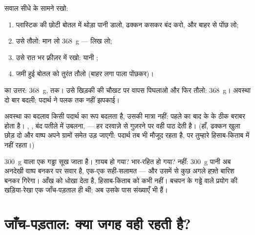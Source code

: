 \begin{method}\label{met:g6:water-states:weigh}
सवाल सीधे  के सामने रखो:
\begin{enumerate}
  \item प्लास्टिक की छोटी बोतल में थोड़ा पानी डालो, ढक्कन कसकर बंद
        करो, और बाहर से पोंछ लो;
  \item उसे तौलो: मान लो \qty{368}{g} --- लिख लो;
  \item उसे रात भर फ़्रीज़र में रखो: यानी ;
  \item जमी हुई बोतल को तुरंत तौलो (बाहर लगा पाला पोंछकर)।
\end{enumerate}
 का उत्तर: \qty{368}{g},  तक। उसे खिड़की की चौखट पर वापस
पिघलाओ और फिर तौलो: \qty{368}{g}। अवस्था दो बार बदली; पदार्थ ने पलक
तक नहीं झपकाई।
\end{method}

\begin{proposition}\label{prop:g6:water-states:mass}
अवस्था का बदलाव किसी पदार्थ का रूप बदलता है, उसकी मात्रा नहीं: पहले
का  बाद के  के ठीक बराबर होता है। , , बंद
पतीले में उबलना,  --- हर दरवाज़े से गुज़रने पर  वही पाठ देती
है। (हाँ, ढक्कन खुला छोड़ दो और वाष्प अपने ग्रामों समेत उड़ जाएगी:
पदार्थ तब भी मौजूद रहता है, पर तुम्हारे हिसाब-किताब में नहीं रहता।)
\end{proposition}

\begin{example}[गड्ढे के ग्राम गए कहाँ]\label{ex:g6:water-states:puddle}
\qty{300}{g} वाला एक गड्ढा सूख जाता है। ग़ायब हो गया? भार-रहित हो गया?
नहीं: \qty{300}{g} पानी अब अनदेखी वाष्प बनकर  पर सवार है, एक-एक
 सही-सलामत --- और उसमें से कुछ अगले हफ़्ते बारिश बनकर गिरेगा।
 आँख को धोखा देता है, हिसाब-किताब को कभी नहीं। बचपन के गड्ढे वाले
प्रयोग की खड़िया-रेखा एक जाँच-पड़ताल ही थी; अब उसके पास संख्याएँ भी
हैं।
\end{example}

\section{जाँच-पड़ताल: क्या जगह वही रहती है?}


